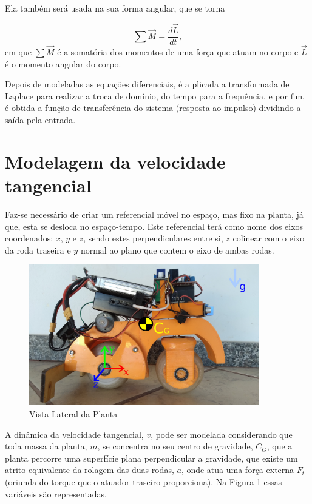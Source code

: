 		Ela também será usada na sua forma angular, que se torna
		
		\begin{equation}
            \sum \vec M  = \frac{d \vec L}{dt},
            \label{SegundaLeiDeNewtonRotações}
        \end{equation}
        em que $\sum \vec M$ é a somatória dos momentos de uma força que atuam no corpo e $\vec L$ é o momento angular do corpo.
        
        Depois de modeladas as equações diferenciais, é a plicada a transformada de Laplace para realizar a troca de domínio, do tempo para a frequência, e por fim, é obtida a função de transferência do sistema (resposta ao impulso) dividindo a saída pela entrada.
		
	\section{Modelagem da velocidade tangencial} \label{sec:modelagemvelocidade}
	
	    Faz-se necessário de criar um referencial móvel no espaço, mas fixo na planta, já que, esta se desloca no espaço-tempo. Este referencial terá como nome dos eixos coordenados: $x$, $y$ e $z$, sendo estes perpendiculares entre si, $z$ colinear com o eixo da roda traseira e $y$ normal ao plano que contem o eixo de ambas rodas.
	    
	    \begin{figure}[h]
            \centering
            \includegraphics[width=10cm]{Imagens/MotinhaLateral2.jpg}
            \caption{Vista Lateral da Planta}
            \label{img:velocidade}
        \end{figure}
	    
		A dinâmica da velocidade tangencial, $v$, pode ser modelada considerando que toda massa da planta, $m$, se concentra no seu centro de gravidade, $C_G$, que a planta percorre uma superfície plana perpendicular a gravidade, que existe um atrito equivalente da rolagem das duas rodas, $a$, onde atua uma força externa $F_t$ (oriunda do torque que o atuador traseiro proporciona). Na Figura \ref{img:velocidade} essas variáveis são representadas.
        
